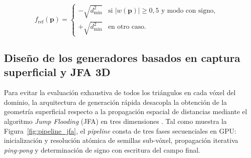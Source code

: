 \begin{enumerate}
  \begin{equation}
    f_{\text{ref}}(\mathbf{p}) = \begin{cases}
      -\sqrt{d_{\min}^2} & \text{si } |w(\mathbf{p})| \ge 0,5 \text{ y modo con signo}, \\
      +\sqrt{d_{\min}^2} & \text{en otro caso.}
    \end{cases}
  \end{equation}
\end{enumerate}

\subsection{Diseño de los generadores basados en captura superficial y JFA 3D}

Para evitar la evaluación exhaustiva de todos los triángulos en cada vóxel del dominio, la arquitectura de generación rápida desacopla la obtención de la geometría superficial respecto a la propagación espacial de distancias mediante el algoritmo \textit{Jump Flooding} (JFA) en tres dimensiones \cite{rong2006}. Tal como muestra la Figura~\ref{fig:pipeline_jfa}, el \textit{pipeline} consta de tres fases secuenciales en GPU: inicialización y resolución atómica de semillas sub-vóxel, propagación iterativa \textit{ping-pong} y determinación de signo con escritura del campo final.

